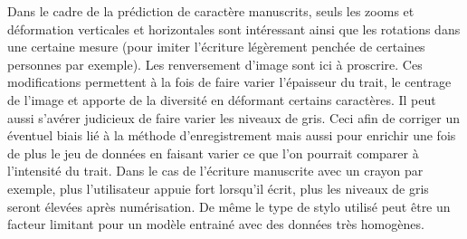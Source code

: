 Dans le cadre de la prédiction de caractère manuscrits, seuls les zooms et 
déformation verticales et horizontales sont intéressant ainsi que les rotations dans une 
certaine mesure (pour imiter l'écriture légèrement penchée de certaines personnes par 
exemple). Les renversement d'image sont ici à proscrire. Ces modifications 
permettent à la fois de faire varier l'épaisseur du trait, le centrage de l'image et 
apporte de la diversité en déformant certains caractères. Il peut aussi s'avérer judicieux
de faire varier les niveaux de gris. Ceci afin de corriger un éventuel biais lié à la 
méthode d'enregistrement mais aussi pour enrichir une fois de plus le jeu de données en 
faisant varier ce que l'on pourrait comparer à l'intensité du trait. Dans le cas de 
l'écriture manuscrite avec un crayon par exemple, plus l'utilisateur appuie fort lorsqu'il 
écrit, plus les niveaux de gris seront élevées après numérisation. De même le type de 
stylo utilisé peut être un facteur limitant pour un modèle entrainé avec des données
très homogènes.
